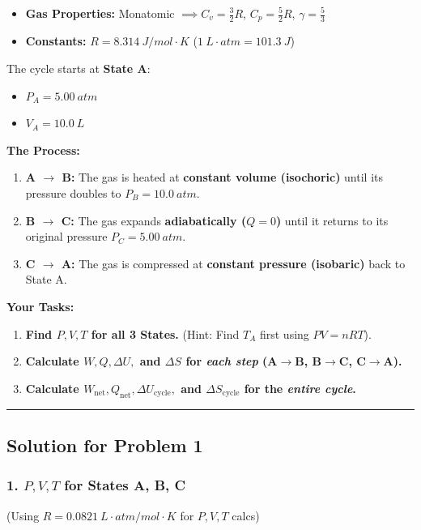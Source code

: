\documentclass[article]{article}
\begin{document}
\begin{itemize}
    \item \textbf{Gas Properties:} Monatomic $\implies C_v = \frac{3}{2}R$, $C_p = \frac{5}{2}R$, $\gamma = \frac{5}{3}$
    \item \textbf{Constants:} $R = \SI{8.314}{J/mol\cdot K}$ ($\SI{1}{L\cdot atm} = \SI{101.3}{J}$)
\end{itemize}

The cycle starts at \textbf{State A}:
\begin{itemize}
    \item $P_A = \SI{5.00}{atm}$
    \item $V_A = \SI{10.0}{L}$
\end{itemize}

\textbf{The Process:}
\begin{enumerate}
    \item \textbf{A $\to$ B:} The gas is heated at \textbf{constant volume (isochoric)} until its pressure doubles to $P_B = \SI{10.0}{atm}$.
    \item \textbf{B $\to$ C:} The gas expands \textbf{adiabatically ($Q=0$)} until it returns to its original pressure $P_C = \SI{5.00}{atm}$.
    \item \textbf{C $\to$ A:} The gas is compressed at \textbf{constant pressure (isobaric)} back to State A.
\end{enumerate}

\textbf{Your Tasks:}
\begin{enumerate}
    \item \textbf{Find $P, V, T$ for all 3 States.} (Hint: Find $T_A$ first using $PV=nRT$).
    \item \textbf{Calculate $W, Q, \Delta U,$ and $\Delta S$ for \textit{each step} (A$\to$B, B$\to$C, C$\to$A).}
    \item \textbf{Calculate $W_{\text{net}}, Q_{\text{net}}, \Delta U_{\text{cycle}},$ and $\Delta S_{\text{cycle}}$ for the \textit{entire cycle}.}
\end{enumerate}

\hrule

\subsection{Solution for Problem 1}

\subsubsection{1. $P, V, T$ for States A, B, C}
(Using $R = \SI{0.0821}{L\cdot atm/mol\cdot K}$ for $P,V,T$ calcs)
\end{document}
